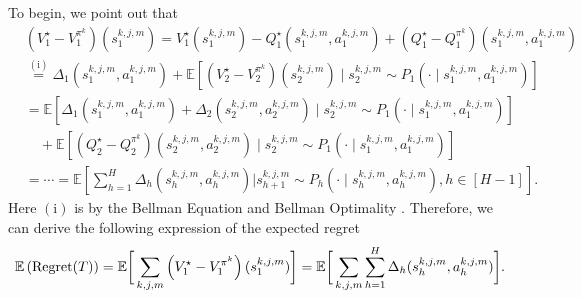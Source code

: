 \documentclass{article}
\begin{document}
To begin, we point out that
\begin{align*}
&\left( V_1^{\star} - V_1^{\pi^k} \right) ( s_1^{k,j,m} ) =V_1^{\star}( s_1^{k,j,m} ) - Q_1^{\star}( s_1^{k,j,m}, a_1^{k,j,m} ) + \left( Q_1^{\star} - Q_1^{\pi^k} \right)( s_1^{k,j,m}, a_1^{k,j,m} ) \\
&\overset{\mathrm{(i)}}{=}\Delta_1( s_1^{k,j,m}, a_1^{k,j,m} ) + \mathbb{E}\left[ \left( V_2^{\star} - V_2^{\pi^k} \right)( s_2^{k,j,m}) \mid s_2^{k,j,m} \sim P_1(\cdot \mid s_1^{k,j,m}, a_1^{k,j,m}) \right] \\
& = \mathbb{E}\left[ \Delta_1( s_1^{k,j,m}, a_1^{k,j,m} ) + \Delta_2( s_2^{k,j,m}, a_2^{k,j,m} )  \mid s_2^{k,j,m} \sim P_1(\cdot \mid s_1^{k,j,m}, a_1^{k,j,m}) \right] \\
&\quad + \mathbb{E}\left[\left( Q_2^{\star} - Q_2^{\pi^k} \right)( s_2^{k,j,m}, a_2^{k,j,m}) \mid s_2^{k,j,m} \sim P_1(\cdot \mid s_1^{k,j,m}, a_1^{k,j,m}) \right]\\
&= \cdots = \mathbb{E} \left[ \sum_{h=1}^H \Delta_h\left( s_h^{k,j,m}, a_h^{k,j,m} \right) \Bigg| s_{h+1}^{k,j,m} \sim P_h(\cdot \mid s_h^{k,j,m}, a_h^{k,j,m}),  h \in [H-1] \right].
\end{align*}
Here $\mathrm{(i)}$ is by the Bellman Equation and Bellman Optimality . Therefore, we can derive the following expression of the expected regret
$$\mathbb{E}\left(\textnormal{Regret}(T)\right) = \mathbb{E}\bigg[\sum_{k,j,m}\left( V_1^{\star} - V_1^{\pi^k} \right) ( s_1^{k,j,m} )\bigg] = \mathbb{E} \bigg[\sum_{k,j,m}\sum_{h=1}^{H} \Delta_h(s_h^{k,j,m}, a_h^{k,j,m})\bigg].$$
\end{document}
